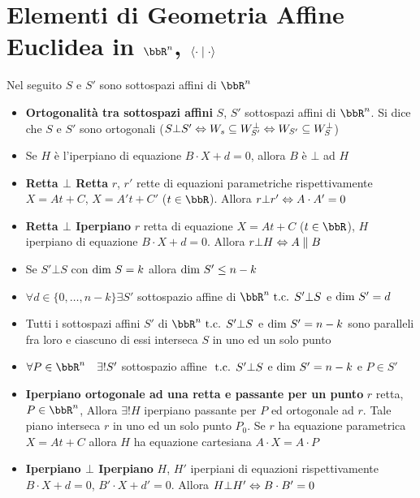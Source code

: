 \documentclass[a4paper,NoNotes,GeneralMath]{stdmdoc}
\begin{document}
	\section*{Elementi di Geometria Affine Euclidea in $\bbR^n$, $\langle \cdot \mid \cdot \rangle$}
	Nel seguito $S$ e $S'$ sono sottospazi affini di $\bbR^n$
	\begin{itemize}
		\item {\bf Ortogonalità tra sottospazi affini} $S$, $S'$ sottospazi affini di $\bbR^n$. Si dice che $S$ e $S'$ sono ortogonali ($S \bot S' \Leftrightarrow W_s \subseteq W_{S'}^\bot \Leftrightarrow W_{S'} \subseteq W_{S}^\bot$)
		\item Se $H$ è l'iperpiano di equazione $B\cdot X + d = 0$, allora $B$ è $\bot$ ad $H$		
		\item {\bf Retta $\bm\bot$ Retta} $r$, $r'$ rette di equazioni parametriche rispettivamente $X=At+C$, $X=A't+C'$ ($t \in \bbR$). Allora $r \bot r' \Leftrightarrow A\cdot A' = 0$
		\item {\bf Retta $\bm\bot$ Iperpiano} $r$ retta di equazione $X=At+C$ ($t \in \bbR$), $H$ iperpiano di equazione $B \cdot X + d = 0$. Allora $r \bot H \Leftrightarrow A \parallel B$
		\item Se $S' \bot S$ con $\mbox{dim } S = k$ allora $\mbox{dim } S' \le n-k$
		\item $\forall d \in \{0, \ldots, n-k\} \exists S'$ sottospazio affine di $\bbR^n \tc S' \bot S$ e $\mbox{dim } S' = d$
		\item Tutti i sottospazi affini $S'$ di $\bbR^n \tc S' \bot S$ e $\mbox{dim } S' = n-k$ sono paralleli fra loro e ciascuno di essi interseca $S$ in uno ed un solo punto
		\item $\forall P \in \bbR^n \quad \exists ! S'$ sottospazio affine $\mbox{ t.c. } S' \bot S$ e $\mbox{dim } S' = n-k$ e $P \in S'$
		\item {\bf Iperpiano ortogonale ad una retta e passante per un punto} $r$ retta, $P \in \bbR^n$, Allora $\exists ! H$ iperpiano passante per $P$ ed ortogonale ad $r$. Tale piano interseca $r$ in uno ed un solo punto $P_0$. Se $r$ ha equazione parametrica $X = At+C$ allora $H$ ha equazione cartesiana $A\cdot X = A \cdot P$
		\item {\bf Iperpiano $\bm\bot$ Iperpiano} $H$, $H'$ iperpiani di equazioni rispettivamente $B \cdot X + d = 0$, $B' \cdot X + d' = 0$. Allora $H \bot H' \Leftrightarrow B \cdot B' = 0$
	\end{itemize}
\end{document}
